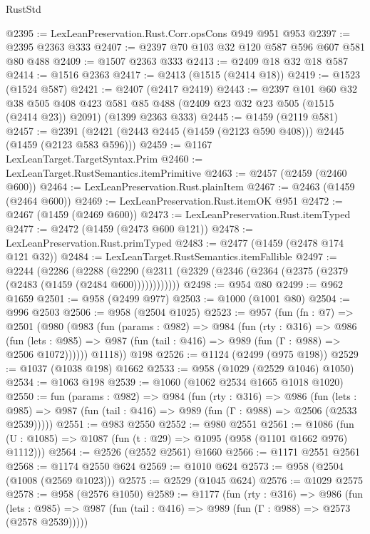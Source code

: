 \begin{lexlean}{RustStd}
\begin{coremodule}
@2395 := LexLeanPreservation.Rust.Corr.opsCons @949 @951 @953
@2397 := @2395 @2363 @333
@2407 := @2397 @70 @103 @32 @120 @587 @596 @607 @581 @80 @488
@2409 := @1507 @2363 @333
@2413 := @2409 @18 @32 @18 @587
@2414 := @1516 @2363
@2417 := @2413 (@1515 (@2414 @18))
@2419 := @1523 (@1524 @587)
@2421 := @2407 (@2417 @2419)
@2443 := @2397
    @101
    @60
    @32
    @38
    @505
    @408
    @423
    @581
    @85
    @488
    (@2409 @23 @32 @23 @505 (@1515 (@2414 @23)) @2091)
    (@1399 @2363 @333)
@2445 := @1459 (@2119 @581)
@2457 := @2391 (@2421 (@2443 @2445 (@1459 (@2123 @590 @408))) @2445 (@1459 (@2123 @583 @596)))
@2459 := @1167 LexLeanTarget.TargetSyntax.Prim
@2460 := LexLeanTarget.RustSemantics.itemPrimitive
@2463 := @2457 (@2459 (@2460 @600))
@2464 := LexLeanPreservation.Rust.plainItem
@2467 := @2463 (@1459 (@2464 @600))
@2469 := LexLeanPreservation.Rust.itemOK @951
@2472 := @2467 (@1459 (@2469 @600))
@2473 := LexLeanPreservation.Rust.itemTyped
@2477 := @2472 (@1459 (@2473 @600 @121))
@2478 := LexLeanPreservation.Rust.primTyped
@2483 := @2477 (@1459 (@2478 @174 @121 @32))
@2484 := LexLeanTarget.RustSemantics.itemFallible
@2497 := @2244
    (@2286
      (@2288 (@2290 (@2311 (@2329 (@2346 (@2364 (@2375 (@2379 (@2483 (@1459 (@2484 @600))))))))))))
@2498 := @954 @80
@2499 := @962 @1659
@2501 := @958 (@2499 @977)
@2503 := @1000 (@1001 @80)
@2504 := @996 @2503
@2506 := @958 (@2504 @1025)
@2523 := @957
    (fun (fn : @7) =>
    @2501
      (@980
        (@983
          (fun (params : @982) =>
          @984
            (fun (rty : @316) =>
            @986
              (fun (lets : @985) =>
              @987 (fun (tail : @416) => @989 (fun (Γ : @988) => @2506 @1072))))))
        @1118))
    @198
@2526 := @1124 (@2499 (@975 @198))
@2529 := @1037 (@1038 @198) @1662
@2533 := @958 (@1029 (@2529 @1046) @1050)
@2534 := @1063 @198
@2539 := @1060 (@1062 @2534 @1665 @1018 @1020)
@2550 := fun (params : @982) =>
  @984
    (fun (rty : @316) =>
    @986
      (fun (lets : @985) =>
      @987 (fun (tail : @416) => @989 (fun (Γ : @988) => @2506 (@2533 @2539)))))
@2551 := @983 @2550
@2552 := @980 @2551
@2561 := @1086 (fun (U : @1085) => @1087 (fun (t : @29) => @1095 (@958 (@1101 @1662 @976) @1112)))
@2564 := @2526 (@2552 @2561) @1660
@2566 := @1171 @2551 @2561
@2568 := @1174 @2550 @624
@2569 := @1010 @624
@2573 := @958 (@2504 (@1008 (@2569 @1023)))
@2575 := @2529 (@1045 @624)
@2576 := @1029 @2575
@2578 := @958 (@2576 @1050)
@2589 := @1177
    (fun (rty : @316) =>
    @986
      (fun (lets : @985) =>
      @987 (fun (tail : @416) => @989 (fun (Γ : @988) => @2573 (@2578 @2539)))))

\end{coremodule}
\end{lexlean}
